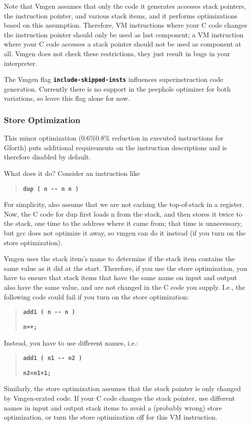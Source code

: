 \documentclass[10pt,english]{article}
\begin{document}
Note that Vmgen assumes that only the code it generates accesses stack
pointers, the instruction pointer, and various stack items, and it
performs optimizations based on this assumption. Therefore, VM instructions
where your C code changes the instruction pointer should only be used
as last component; a VM instruction where your C code accesses a stack
pointer should not be used as component at all. Vmgen does not check
these restrictions, they just result in bugs in your interpreter.

The Vmgen flag \texttt{\textbf{include-skipped-insts}} influences
superinstruction code generation. Currently there is no support in
the peephole optimizer for both variations, so leave this flag alone
for now.


\subsubsection{Store Optimization}

This minor optimization (0.6\%\textendash{}0.8\% reduction in executed
instructions for Gforth) puts additional requirements on the instruction
descriptions and is therefore disabled by default.

What does it do? Consider an instruction like
\begin{quotation}
\texttt{\textbf{dup ( n -{}- n n )}}
\end{quotation}
For simplicity, also assume that we are not caching the top-of-stack
in a register. Now, the C code for dup first loads n from the stack,
and then stores it twice to the stack, one time to the address where
it came from; that time is unnecessary, but gcc does not optimize
it away, so vmgen can do it instead (if you turn on the store optimization).

Vmgen uses the stack item's name to determine if the stack item contains
the same value as it did at the start. Therefore, if you use the store
optimization, you have to ensure that stack items that have the same
name on input and output also have the same value, and are not changed
in the C code you supply. I.e., the following code could fail if you
turn on the store optimization:
\begin{quotation}
\texttt{\textbf{add1 ( n -{}- n )}}

\texttt{\textbf{n++;}}
\end{quotation}
Instead, you have to use different names, i.e.:
\begin{quotation}
\texttt{\textbf{add1 ( n1 -{}- n2 )}}

\texttt{\textbf{n2=n1+1;}}
\end{quotation}
Similarly, the store optimization assumes that the stack pointer is
only changed by Vmgen-erated code. If your C code changes the stack
pointer, use different names in input and output stack items to avoid
a (probably wrong) store optimization, or turn the store optimization
off for this VM instruction.
\end{document}
